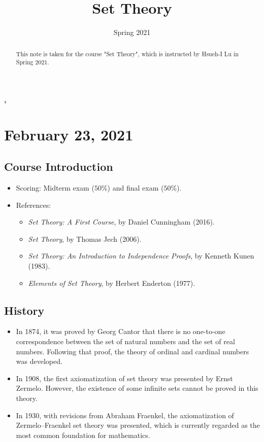 \documentclass[11pt]{article}
\title{Set Theory}
\date{Spring 2021}
\begin{document}
\begin{center}
  \LARGE \bfseries \thetitle, \thedate
\end{center}

\begin{abstract}
  This note is taken for the course "Set Theory", which is instructed by Hsueh-I Lu in Spring 2021.
\end{abstract}

\tableofcontents

\section{February 23, 2021}
\subsection{Course Introduction}
\begin{itemize}
  \item Scoring: Midterm exam ($50\%$) and final exam ($50\%$).
  \item References:
  \begin{itemize}
    \item \textsl{Set Theory: A First Course}, by Daniel Cunningham (2016).
    \item \textsl{Set Theory}, by Thomas Jech (2006).
    \item \textsl{Set Theory: An Introduction to Independence Proofs}, by Kenneth Kunen (1983).
    \item \textsl{Elements of Set Theory}, by Herbert Enderton (1977).
  \end{itemize}
\end{itemize}

\subsection{History}
\begin{itemize}
  \item In 1874, it was proved by Georg Cantor that there is no one-to-one correspondence between the set of natural numbers and the set of real numbers.
  Following that proof, the theory of ordinal and cardinal numbers was developed.
  \item In 1908, the first axiomatization of set theory was presented by Ernst Zermelo.
  However, the existence of some infinite sets cannot be proved in this theory.
  \item In 1930, with revisions from Abraham Fraenkel, the axiomatization of Zermelo--Fraenkel set theory was presented, which is currently regarded as the most common foundation for mathematics.
\end{itemize}
\end{document}

